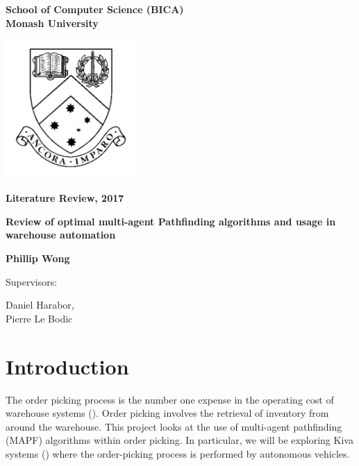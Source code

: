 \documentclass[a4paper,11pt]{article}
\begin{document}
	
\thispagestyle{empty} %
\renewcommand{\thepage}{\roman{page}}

\begin{spacing}{1.5}
	\begin{center}
		{\Large \bfseries
			School of Computer Science (BICA) \\
			Monash University}
		
		
		\vspace*{30mm}
		
		\includegraphics[width=5cm]{graphics/MonashCrest.pdf}
		
		\vspace*{15mm}
		
		{\large \bfseries
			Literature Review, 2017
		}
		
		\vspace*{10mm}
		
		{\LARGE \bfseries
			Review of optimal multi-agent Pathfinding algorithms and usage in warehouse automation
		}
		
		\vspace*{20mm}
		
		{\large \bfseries
			Phillip Wong
			
			\vspace*{20mm}
			
			
			Supervisors: \parbox[t]{50mm}{Daniel Harabor,\\Pierre Le Bodic}
		}
		
	\end{center}
\end{spacing}

\newpage

\tableofcontents

\newpage
\setcounter{page}{1}
\renewcommand{\thepage}{\arabic{page}}

\section{Introduction} \label{sec:introduction}
The order picking process is the number one expense in the operating cost of warehouse systems (\cite{de2007design}). Order picking involves the retrieval of inventory from around the warehouse.
This project looks at the use of multi-agent pathfinding (MAPF) algorithms within order picking. In particular, we will be exploring Kiva systems (\cite{wurman2008coordinating}) where the order-picking process is performed by autonomous vehicles.
\end{document}
